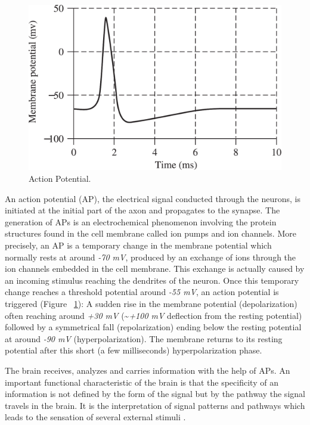 \documentclass[12pt]{article}
\numberwithin{equation}{section}
\numberwithin{figure}{section}
\numberwithin{table}{section}
\begin{document}
\par{
    \begin{figure}[ht]
        \centering
        \includegraphics[scale=0.4]{images/ap}
        \caption[Action Potential.]{Action Potential. \citep{sanei_eeg_2008}}
        \label{fig:action_pot}
    \end{figure}
    An action potential (AP), the electrical signal conducted through the neurons,
    is initiated at the initial part of the axon and propagates to the synapse.
    The generation of APs is an electrochemical phenomenon involving the protein
    structures found in the cell membrane called ion pumps and ion channels.
    More precisely, an AP is a temporary change in the membrane potential which
    normally rests at around \emph{-70 mV}, produced by an exchange of ions through the
    ion channels embedded in the cell membrane. This exchange is actually
    caused by an incoming stimulus reaching the dendrites of the neuron.
    Once this temporary change reaches a threshold potential around \emph{-55 mV}, an action potential is triggered
    (Figure ~\ref{fig:action_pot}): A sudden rise in the membrane potential (depolarization) often
    reaching around \emph{+30 mV} (\textasciitilde\emph{+100 mV} deflection from the resting
    potential) followed by a symmetrical fall (repolarization) ending below the resting potential
    at around \emph{-90 mV} (hyperpolarization). The membrane returns to its resting
    potential after this short (a few milliseconds) hyperpolarization phase.
}
\par{
    The brain receives, analyzes and carries information with the help of APs.
    An important functional characteristic of the brain is that the specificity
    of an information is not defined by the form of the signal but by the pathway
    the signal travels in the brain. It is the interpretation of signal patterns
    and pathways which leads to the sensation of several external stimuli \citep{kandel_principles_2013}.
}
\end{document}
